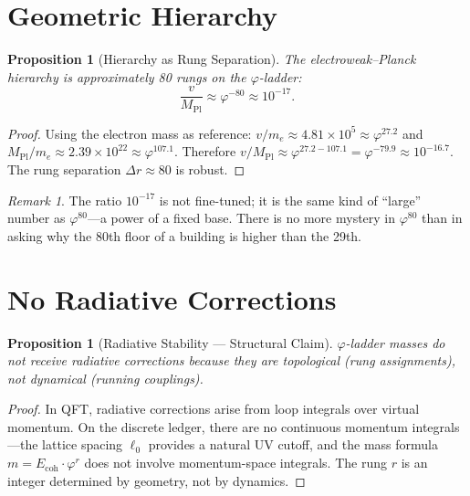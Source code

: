 \documentclass[12pt,a4paper]{article}
\newtheorem{proposition}[theorem]{Proposition}
\theoremstyle{definition}
\theoremstyle{remark}
\newtheorem{remark}[theorem]{Remark}
\begin{document}
\section{Geometric Hierarchy}
\label{sec:geometric}

\begin{proposition}[Hierarchy as Rung Separation]
\label{thm:hierarchy}
The electroweak--Planck hierarchy is approximately 80 rungs on the
$\varphi$-ladder:
\begin{equation}
  \boxed{\frac{v}{M_{\mathrm{Pl}}} \approx \varphi^{-80}
  \approx 10^{-17}.}
\end{equation}
\end{proposition}

\begin{proof}
Using the electron mass as reference: $v/m_e \approx 4.81 \times 10^5
\approx \varphi^{27.2}$ and $M_{\mathrm{Pl}}/m_e \approx 2.39 \times
10^{22} \approx \varphi^{107.1}$.  Therefore
$v/M_{\mathrm{Pl}} \approx \varphi^{27.2 - 107.1} = \varphi^{-79.9}
\approx 10^{-16.7}$.  The rung separation $\Delta r \approx 80$ is
robust.
\end{proof}

\begin{remark}
The ratio $10^{-17}$ is not fine-tuned; it is the same kind of
``large'' number as $\varphi^{80}$---a power of a fixed base.
There is no more mystery in $\varphi^{80}$ than in asking why the
80th floor of a building is higher than the 29th.
\end{remark}

\section{No Radiative Corrections}
\label{sec:no-radiative}

\begin{proposition}[Radiative Stability --- Structural Claim]
$\varphi$-ladder masses do not receive radiative corrections
because they are topological (rung assignments), not dynamical
(running couplings).
\end{proposition}

\begin{proof}
In QFT, radiative corrections arise from loop integrals over
virtual momentum.  On the discrete ledger, there are no continuous
momentum integrals---the lattice spacing $\ell_0$ provides a
natural UV cutoff, and the mass formula
$m = E_{\mathrm{coh}} \cdot \varphi^r$ does not involve
momentum-space integrals.  The rung $r$ is an integer determined
by geometry, not by dynamics.
\end{proof}
\end{document}
